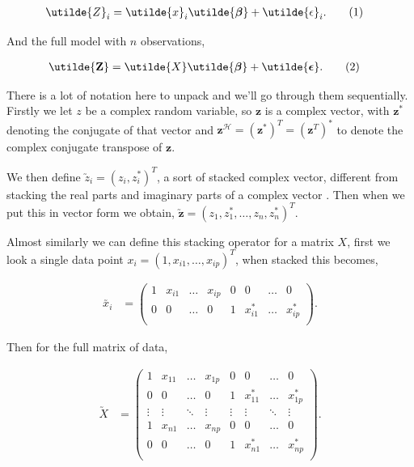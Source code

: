 \documentclass[honours,12pt]{unswthesis}
\newcommand{\augz}{\mathbf{\utilde{z}}}
\newcommand{\ct}{\mathcal{H}}
\newcommand\numberthis{\addtocounter{equation}{1}\tag{\theequation}}
\numberwithin{equation}{section}
\begin{document}
\begin{align*}
	\utilde{Z}_{i} &= \utilde{x}_{i} \utilde{\bm{\beta}} + \utilde{\epsilon}_{i}. \numberthis \label{complexmodel}
\end{align*}

\noindent And the full model with $n$ observations,

\begin{align*}
	\utilde{\mathbf{Z}} &= \utilde{X} \utilde{\bm{\beta}} + \utilde{\bm{\epsilon}}. \numberthis \label{complexmodelfull}
\end{align*}

\noindent There is a lot of notation here to unpack and we'll go through them sequentially. Firstly we let $z$ be a complex random variable, so $\mathbf{z}$ is a complex vector, with $\mathbf{z}^{*}$ denoting the conjugate of that vector and $\mathbf{z}^{\ct} = \left( \mathbf{z}^{*} \right)^{T} = \left( \mathbf{z}^{T} \right)^{*}$ to denote the complex conjugate transpose of $\mathbf{z}$. \par
\noindent We then define $\utilde{z}_{i} = \left( z_{i}, z_{i}^{*} \right)^{T}$, a sort of stacked complex vector, different from stacking the real parts and imaginary parts of a complex vector \cite{yan2012}. Then when we put this in vector form we obtain, $\augz = \left( z_{1}, z_{1}^{*}, \hdots, z_{n}, z_{n}^{*} \right)^{T}$. \par
\noindent Almost similarly we can define this stacking operator for a matrix $X$, first we look a single data point $x_{i} = \left( 1, x_{i1}, \dots, x_{ip}\right)^{T}$, when stacked this becomes,

\begin{align*}
	\utilde{x_{i}} &= \begin{pmatrix}
		1 & x_{i1} & \hdots & x_{ip} & 0 & 0 & \hdots & 0\\
		0 & 0 & \hdots & 0 & 1 & x_{i1}^{*} & \hdots & x_{ip}^{*} \\
	\end{pmatrix}.
\end{align*}

\noindent Then for the full matrix of data,

\begin{align*}
	\utilde{X} &= \begin{pmatrix}
		1 & x_{11} & \hdots & x_{1p} & 0 & 0 & \hdots & 0\\
		0 & 0 & \hdots & 0 & 1 & x_{11}^{*} & \hdots & x_{1p}^{*} \\
		\vdots & \vdots & \ddots & \vdots & \vdots & \vdots & \ddots & \vdots \\
		1 & x_{n1} & \hdots & x_{np} & 0 & 0 & \hdots & 0\\
		0 & 0 & \hdots & 0 & 1 & x_{n1}^{*} & \hdots & x_{np}^{*} \\
	\end{pmatrix}.
\end{align*}
\end{document}
